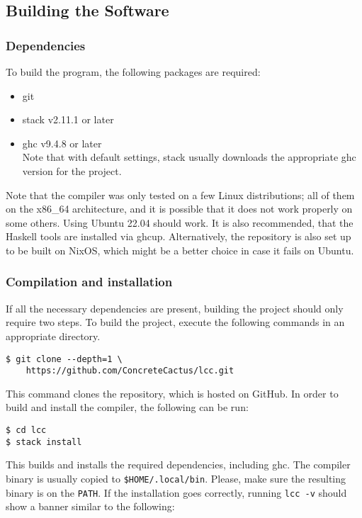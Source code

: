\documentclass[12pt]{article}
\begin{document}
\subsection{Building the Software}
\subsubsection{Dependencies}

To build the program, the following packages are required:
\begin{itemize}
    \item git
    \item stack v2.11.1 or later
    \item ghc v9.4.8 or later \\ Note that with default settings, stack usually
        downloads the appropriate ghc version for the project.
\end{itemize}
Note that the compiler was only tested on a few Linux distributions; all of them
on the x86\_64 architecture, and it is possible that it does not work properly
on some others. Using Ubuntu 22.04 should work. It is also recommended, that the
Haskell tools are installed via ghcup. Alternatively, the repository is also set
up to be built on NixOS, which might be a better choice in case it fails on
Ubuntu.

\subsubsection{Compilation and installation}

If all the necessary dependencies are present, building the project should only
require two steps. To build the project, execute the following commands in an
appropriate directory.
\begin{lstlisting}
$ git clone --depth=1 \
    https://github.com/ConcreteCactus/lcc.git
\end{lstlisting}
This command clones the repository, which is hosted on GitHub. In order to build
and install the compiler, the following can be run:
\begin{lstlisting}
$ cd lcc
$ stack install
\end{lstlisting}
This builds and installs the required dependencies, including ghc. The compiler
binary is usually copied to \texttt{\$HOME/.local/bin}. Please, make sure the
resulting binary is on the \texttt{PATH}. If the installation goes correctly,
running \texttt{lcc -v} should show a banner similar to the following:
\end{document}
